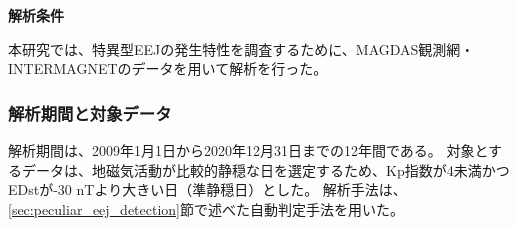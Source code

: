 \textbf{解析条件}

本研究では、特異型EEJの発生特性を調査するために、MAGDAS観測網・INTERMAGNETのデータを用いて解析を行った。

\subsubsection{解析期間と対象データ}
解析期間は、2009年1月1日から2020年12月31日までの12年間である。
対象とするデータは、地磁気活動が比較的静穏な日を選定するため、Kp指数が4未満かつEDstが-30 nTより大きい日（準静穏日）とした。
解析手法は、\ref{sec:peculiar_eej_detection}節で述べた自動判定手法を用いた。
